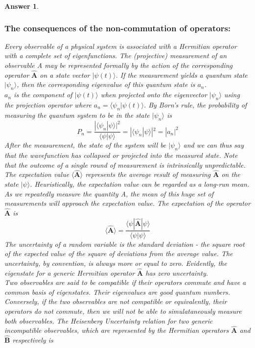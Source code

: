 \documentclass[a4paper]{article}
\newtheorem{ans}{Answer}[subsection]
\theoremstyle{new}
\begin{document}
\begin{ans}\leavevmode
\subsubsection*{The consequences of the non-commutation of operators:}
Every observable of a physical system is associated with a Hermitian operator with a complete set of eigenfunctions. The (projective) measurement of an observable A may be represented formally by the action of the corresponding operator $\mathbf{\hat{A}}$ on a state vector $|\psi(t)\big\rangle$. If the measurement yields a quantum state $|\psi_n\big\rangle$, then the corresponding eigenvalue of this quantum state is $a_n$.\\[5pt]
$a_n$ is the component of $|\psi(t)\big\rangle$ when projected onto the eigenvector $|\psi_n\big\rangle$ using the projection operator where $a_n=\big\langle\psi_n|\psi(t)\big\rangle$. By Born's rule, the probability of measuring the quantum system to be in the state $|\psi_n\big\rangle$ is 
$$P_n=\frac{|\big\langle\psi_n|\psi\big\rangle|^2}{\big\langle\psi|\psi\big\rangle}=|\big\langle\psi_n|\psi\big\rangle|^2=|a_n|^2$$
After the measurement, the state of the system will be $|\psi_n\big\rangle$  and we can thus say that the wavefunction has collapsed or projected into the measured state. Note that the outcome of a single round of measurement is intrinsically unpredictable.\\[5pt]
The expectation value $\big\langle\mathbf{\hat{A}}\big\rangle$ represents the average result of measuring $\mathbf{\hat{A}}$ on the state $|\psi\big\rangle$. Heuristically, the expectation value can be regarded as a long-run mean. As we repeatedly measure the quantity A, the mean of this huge set of measurements will approach the expectation value. The expectation of the operator $\mathbf{\hat{A}}$ is
$$\langle\mathbf{\hat{A}}\rangle=\frac{\langle\psi|\mathbf{\hat{A}}|\psi\rangle}{\langle\psi|\psi\rangle}$$
The uncertainty of a random variable is the standard deviation - the square root of the expected value of the square of deviations from the average value. The uncertainty, by convention, is always more or equal to zero. Evidently, the eigenstate for a generic Hermitian operator $\mathbf{\hat{A}}$ has zero uncertainty.\\[5pt]
Two observables are said to be compatible if their operators commute and have a common basis of eigenstates. Their eigenvalues are good quantum numbers. Conversely, if the two observables are not compatible or equivalently, their operators do not commute, then we will not be able to simulataneously measure both observables. The Heisenberg Uncertainty relation for two generic incompatible observables, which are represented by the  Hermitian operators $\mathbf{\hat{A}}$ and $\mathbf{\hat{B}}$ respectively is

\end{ans}
\end{document}
